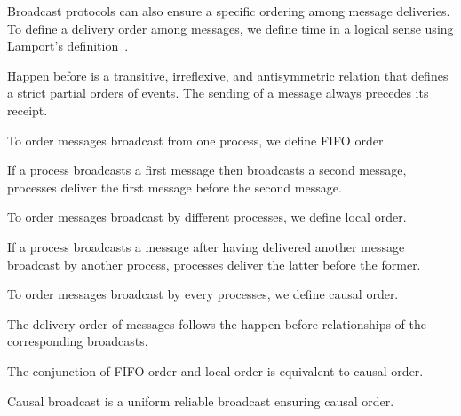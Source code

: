 
Broadcast protocols can also ensure a specific ordering among message
deliveries.
To define a delivery order among messages, we define time in a logical sense
using Lamport's definition~\cite{lamport1978time}.

\begin{definition}
  Happen before is a transitive, irreflexive, and antisymmetric relation that
  defines a strict partial orders of events.  The sending of a message always
  precedes its receipt.
\end{definition}

To order messages broadcast from one process, we define FIFO order.

\begin{definition}
  If a process broadcasts a first message then broadcasts a second message,
  processes deliver the first message before the second message.
\end{definition}

To order messages broadcast by different processes, we define local order.

\begin{definition}
  If a process broadcasts a message after having delivered another message
  broadcast by another process, processes deliver the latter before the former.
\end{definition}

To order messages broadcast by every processes, we define causal order.

\begin{definition}
  The delivery order of messages follows the happen before relationships of the
  corresponding broadcasts.
\end{definition}

\begin{theorem}
  The conjunction of FIFO order and local order is equivalent to causal order.
\end{theorem}

\begin{definition}
  Causal broadcast is a uniform reliable broadcast ensuring causal order.
\end{definition}

